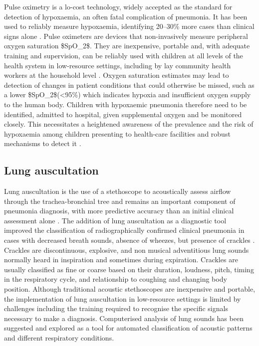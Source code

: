 Pulse oximetry is a lo-cost technology, widely accepted as the standard for detection of hypoxaemia, an often fatal complication of pneumonia. It has been used to reliably measure hypoxaemia, identifying 20–30\% more cases than clinical signs alone \cite{duke2009pulse}.
 Pulse oximeters are devices that non-invasively measure peripheral oxygen saturation \gls{$SpO_2$}. They are inexpensive, portable and, with adequate training and supervision, can be reliably used with children at all levels of the health system in low-resource settings, including by lay community health workers at the household level \cite{goodman2019challenges}. Oxygen saturation estimates may lead to detection of changes in patient conditions that could otherwise be missed, such as a lower \gls{$SpO_2$}(<95\%) which indicates hypoxia and insufficient oxygen supply to the human body.
Children with hypoxaemic pneumonia therefore need to be identified, admitted to hospital, given supplemental oxygen and be monitored closely. This necessitates a heightened awareness of the prevalence and the risk of hypoxaemia among children presenting to health-care facilities and robust mechanisms to detect it \cite{subhi2009prevalence}.

\subsection{Lung auscultation}

Lung auscultation is the use of a stethoscope to acoustically assess airflow through the trachea-bronchial tree and remains an important component of pneumonia diagnosis, with more predictive accuracy than an initial clinical assessment alone \cite{pervaiz2018building}. 
The addition of lung auscultation as a diagnostic tool improved the classification of radiographically confirmed clinical pneumonia in cases with decreased breath sounds, absence of wheezes, but presence of crackles \cite{pervaiz2018building}. Crackles are discontinuous, explosive, and non musical adventitious lung sounds normally heard in inspiration and sometimes during expiration. Crackles are usually classified as fine or coarse based on their duration, loudness, pitch, timing in the respiratory cycle, and relationship to coughing and changing body position\cite{sarkar2015auscultation}. Although traditional acoustic stethoscopes are inexpensive and portable, the implementation of lung auscultation in low-resource settings is limited by challenges including the training required to recognise the specific signals necessary to make a diagnosis. Computerised analysis of lung sounds has been suggested and explored as a tool for automated classification of acoustic patterns and different respiratory conditions.

